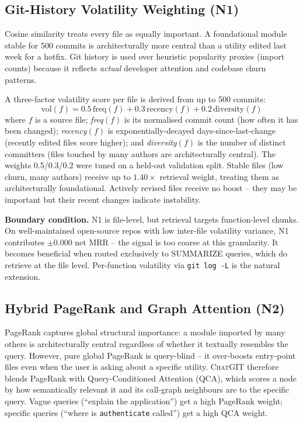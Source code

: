\documentclass[conference]{IEEEtran}
\newcommand{\chatgit}{\textsc{ChatGIT}\xspace}
\begin{document}
\subsection{Git-History Volatility Weighting (N1)}

Cosine similarity treats every file as equally
important. A foundational module stable for 500 commits is architecturally
more central than a utility edited last week for a hotfix.
Git history is used over heuristic popularity proxies (import counts) because
it reflects \emph{actual} developer attention and codebase churn patterns.

A three-factor volatility score per file is derived from up to 500 commits:
\begin{equation}
\text{vol}(f) = 0.5\,\text{freq}(f) + 0.3\,\text{recency}(f) + 0.2\,\text{diversity}(f)
\end{equation}
where $f$ is a source file; \textit{freq}$(f)$ is its normalised commit
count (how often it has been changed); \textit{recency}$(f)$ is
exponentially-decayed days-since-last-change (recently edited files score
higher); and \textit{diversity}$(f)$ is the number of distinct committers
(files touched by many authors are architecturally central). The weights
0.5/0.3/0.2 were tuned on a held-out validation split. Stable files (low churn, many authors) receive
up to $1.40\times$ retrieval weight, treating them as architecturally
foundational. Actively revised files receive no boost -- they may be
important but their recent changes indicate instability.

\textbf{Boundary condition.} N1 is file-level, but retrieval targets
function-level chunks. On well-maintained open-source repos with low
inter-file volatility variance, N1 contributes $\pm$0.000 net MRR --
the signal is too coarse at this granularity. It becomes beneficial when
routed exclusively to SUMMARIZE queries, which do retrieve at the file
level. Per-function volatility via \texttt{git log -L} is the natural
extension.

\subsection{Hybrid PageRank and Graph Attention (N2)}

PageRank captures global structural importance: a module
imported by many others is architecturally central regardless of
whether it textually resembles the query. However, pure global PageRank is
query-blind -- it over-boosts entry-point files even when the user is asking
about a specific utility. \chatgit therefore blends PageRank with Query-Conditioned
Attention (QCA), which scores a node by how semantically relevant it and its
call-graph neighbours are to the specific query. Vague queries (``explain
the application'') get a high PageRank weight; specific queries (``where is
\texttt{authenticate} called'') get a high QCA weight.
\end{document}
